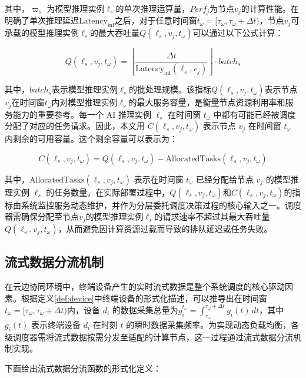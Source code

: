 其中，$\varpi_s$ 为模型推理实例$\ell_s$的单次推理运算量，$Perf_j$为节点$v_j$的计算性能。在明确了单次推理延迟$\text{Latency}_{\text{inf}}$之后，对于任意时间窗$t_\omega = [\tau_\omega, \tau_\omega + \Delta t)$，节点$v_j$可承载的模型推理实例$\ell_s$的最大吞吐量$Q(\ell_s, v_j, t_\omega)$可以通过以下公式计算：

\begin{equation}
Q(\ell_s, v_j, t_\omega) = \left\lfloor \frac{\Delta t}{\text{Latency}_{\text{inf}}(\ell_s, v_j)} \right\rfloor \cdot batch_s
\end{equation}

其中，$batch_s$表示模型推理实例$\ell_s$的批处理规模。该指标$Q(\ell_s, v_j, t_\omega)$表示节点$v_j$在时间窗$t_\omega$内对模型推理实例$\ell_s$的最大服务容量，是衡量节点资源利用率和服务能力的重要参考。每一个 AI 推理实例 $\ell_s$ 在时间窗 $t_\omega$ 中都有可能已经被调度分配了对应的任务请求。因此，本文用 $C(\ell_s, v_j, t_\omega)$ 表示节点 $v_j$ 在时间窗 $t_\omega$ 内剩余的可用容量。这个剩余容量可以表示为：

\begin{equation}
C(\ell_s, v_j, t_\omega) = Q(\ell_s, v_j, t_\omega) - \text{AllocatedTasks}(\ell_s, v_j, t_\omega)
\end{equation}

其中，$\text{AllocatedTasks}(\ell_s, v_j, t_\omega)$ 表示在时间窗 $t_\omega$ 已经分配给节点 $v_j$ 的模型推理实例 $\ell_s$ 的任务数量。在实际部署过程中，$Q(\ell_s, v_j, t_\omega)$和$C(\ell_s, v_j, t_\omega)$的指标由系统监控服务动态维护，并作为分层委托调度决策过程的核心输入之一。调度器需确保分配至节点$v_j$的模型推理实例$\ell_s$的请求速率不超过其最大吞吐量$Q(\ell_s, v_j, t_\omega)$，从而避免因计算资源过载而导致的排队延迟或任务失败。


\subsection{流式数据分流机制}

在云边协同环境中，终端设备产生的实时流式数据是整个系统调度的核心驱动因素。根据定义\ref{def:device}中终端设备的形式化描述，可以推导出在时间窗$t_\omega = [\tau_\omega, \tau_\omega + \Delta t)$内，设备 $d_i$ 的数据采集总量为$g_i^{t_\omega} = \int_{\tau_\omega}^{\tau_\omega + \Delta t} g_i(t) \, dt$，其中$g_i(t)$ 表示终端设备 $d_i$ 在时刻 $t$ 的瞬时数据采集频率。为实现动态负载均衡，各级调度器需将流式数据按需分发至适配的计算节点，这一过程通过流式数据分流机制实现。

下面给出流式数据分流函数的形式化定义：

